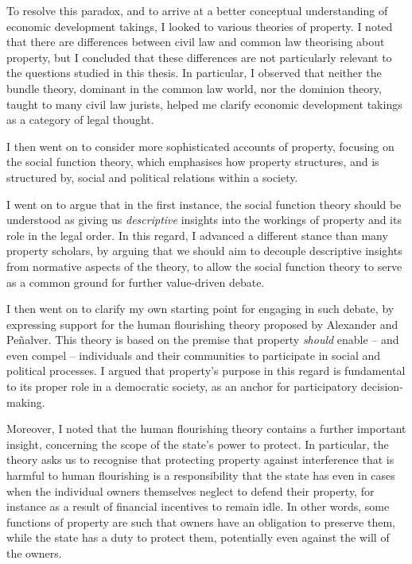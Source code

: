 To resolve this paradox, and to arrive at a better conceptual understanding of economic development takings, I looked to various theories of property. I noted that there are differences between civil law and common law theorising about property, but I concluded that these differences are not particularly relevant to the questions studied in this thesis. In particular, I observed that neither the bundle theory, dominant in the common law world, nor the dominion theory, taught to many civil law jurists, helped me clarify economic development takings as a category of legal thought.

I then went on to consider more sophisticated accounts of property, focusing on the social function theory, which emphasises how property structures, and is structured by, social and political relations within a society. 

I went on to argue that in the first instance, the social function theory should be understood as giving us {\it descriptive} insights into the workings of property and its role in the legal order. In this regard, I advanced a different stance than many property scholars, by arguing that we should aim to decouple descriptive insights from normative aspects of the theory, to allow the social function theory to serve as a common ground for further value-driven debate.

I then went on to clarify my own starting point for engaging in such debate, by expressing support for the human flourishing theory proposed by Alexander and Pe\~{n}alver. This theory is based on the premise that property {\it should} enable -- and even compel -- individuals and their communities to  participate in social and political processes. I argued that property's purpose in this regard is  fundamental to its proper role in a democratic society, as an anchor for participatory decision-making.  

Moreover, I noted that the human flourishing theory contains a further important insight, concerning the scope of the state's power to protect. In particular, the theory asks us to recognise that protecting property against interference that is harmful to human flourishing is a responsibility that the state has even in cases when the individual owners themselves neglect to defend their property, for instance as a result of financial incentives to remain idle. In other words, some functions of property are such that owners have an obligation to preserve them, while the state has a duty to protect them, potentially even against the will of the owners.


